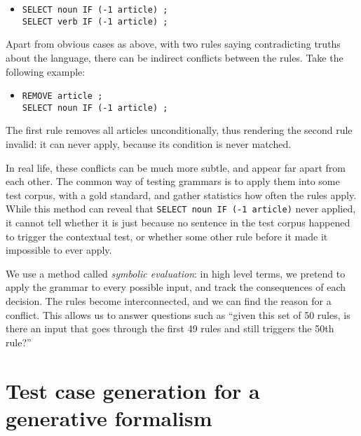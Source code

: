 \begin{itemize}
\item[] \texttt{SELECT noun IF (-1 article) ;} \\ \texttt{SELECT verb IF (-1 article) ;}
\end{itemize}

Apart from obvious cases as above, with two rules saying contradicting truths about the language, there can be indirect conflicts between the rules. Take the following example:

\begin{itemize}
\item[] \texttt{REMOVE article ;} \\ \texttt{SELECT noun IF (-1 article) ;}
\end{itemize}

\noindent The first rule removes all articles unconditionally, thus rendering the second rule invalid: it can never apply, because its condition is never matched.

In real life, these conflicts can be much more subtle, and appear far apart from each other. %
The common way of testing grammars is to apply them into some test corpus, with a gold standard, and gather statistics how often the rules apply. While this method can reveal that \texttt{SELECT noun IF (-1 article)} never applied, it cannot tell whether it is just because no sentence in the test corpus happened to trigger the contextual test, or whether some other rule before it made it impossible to ever apply.

We use a method called \emph{symbolic evaluation}: in high level terms, we pretend to apply the grammar to every possible input, and track the consequences of each decision.
The rules become interconnected, and we can find the reason for a conflict. This allows us to answer questions such as ``given this set of 50 rules, is there an input that goes through the first 49 rules and still triggers the 50th rule?''



\section{Test case generation for a generative formalism}

